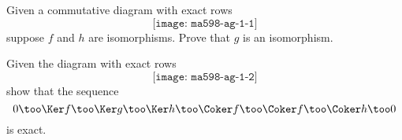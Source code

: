 \begin{problem}[\(5\)-lemma]
  Given a commutative diagram with exact rows
  \[
    \texttt{[image: ma598-ag-1-1]}
  \]
  suppose \(f\) and \(h\) are isomorphisms. Prove that \(g\) is an
  isomorphism.
\end{problem}
\begin{solution}
\end{solution}
\newpage

\begin{problem}
  Given the diagram with exact rows
  \[
    \texttt{[image: ma598-ag-1-2]}
  \]
  show that the sequence
  \[
    0\too
    \Ker f\too
    \Ker g\too
    \Ker h\too
    \Coker f\too
    \Coker f\too
    \Coker h\too
    0
  \]
  is exact.
\end{problem}
\begin{solution}
\end{solution}
\newpage

\begin{problem}
\end{problem}
\begin{solution}
\end{solution}
\newpage

\begin{problem}
\end{problem}
\begin{solution}
\end{solution}
\newpage

\begin{problem}
\end{problem}
\begin{solution}
\end{solution}
\newpage

\begin{problem}
\end{problem}
\begin{solution}
\end{solution}

